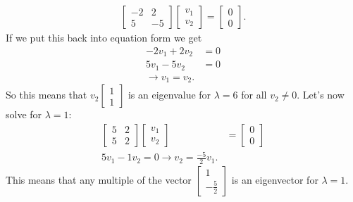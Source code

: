 \begin{eg}
\begin{align*}
    \begin{bmatrix} -2&2\\5&-5 \end{bmatrix} \begin{bmatrix} v_1\\v_2 \end{bmatrix} =\begin{bmatrix} 0\\0 \end{bmatrix} 
  .\end{align*}
  If we put this back into equation form we get 
  \begin{align*}
    -2v_1+2v_2&=0\\
    5v_1-5v_2&=0\\
    \to v_1=v_2
  .\end{align*}
  So this means that $v_2\begin{bmatrix} 1\\1 \end{bmatrix} $ is an eigenvalue for $\lambda=6$ for all $v_2\neq 0$. Let's now solve for $\lambda=1:$
  \begin{align*}
    \begin{bmatrix} 5&2\\5&2 \end{bmatrix} \begin{bmatrix} v_1\\v_2 \end{bmatrix} &=\begin{bmatrix} 0\\0 \end{bmatrix} \\
    5v_1-1v_2=0\to v_2=\frac{-5}{2}v_1
  .\end{align*}
  This means that any multiple of the vector $\begin{bmatrix} 1\\-\frac{5}{2} \end{bmatrix}$ is an eigenvector for $\lambda=1$.
\end{eg}

